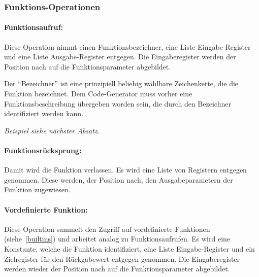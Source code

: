 \documentclass[twoside,a4paper,fleqn,12pt]{book}
\begin{document}

\subsubsection{Funktions-Operationen}

\paragraph{Funktionsaufruf:} Diese Operation nimmt einen Funktionsbezeichner, eine Liste Eingabe-Register und eine Liste Ausgabe-Register
entgegen.
Die Eingaberegister werden der Position nach auf die Funktionsparameter abgebildet.

Der "`Bezeichner"' ist eine prinzipiell beliebig wählbare Zeichenkette, die die Funktion bezeichnet. Dem Code-Generator muss
vorher eine Funktionsbeschreibung übergeben worden sein, die durch den Bezeichner identifiziert werden kann.

\emph{Beispiel siehe nächster Absatz.}


\paragraph{Funktionsrücksprung:} Damit wird die Funktion verlassen. Es wird eine Liste von Registern entgegen genommen. Diese
werden, der Position nach, den Ausgabeparametern der Funktion zugewiesen.



\paragraph{Vordefinierte Funktion:} Diese Operation sammelt den Zugriff auf vordefinierte Funktionen (siehe~\ref{builtins})
und arbeitet analog zu Funktionsaufrufen. Es wird eine Konstante, welche die Funktion identifiziert, eine Liste Eingabe-Register 
und ein Zielregister für den Rückgabewert entgegen genommen. Die Eingaberegister werden wieder der Position nach auf die Funktionsparameter abgebildet.
\end{document}
